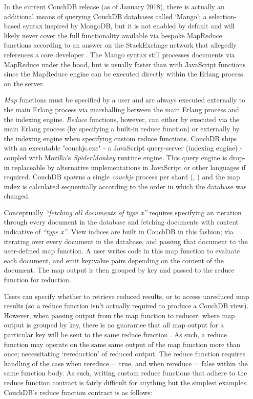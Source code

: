 In the current CouchDB release (as of January 2018), there is actually an additional means of querying CouchDB databases called `Mango'; a selection-based syntax inspired by MongoDB, but it is not enabled by default and will likely never cover the full functionality available via bespoke MapReduce functions according to an answer on the StackExchnge network that allegedly references a core developer \cite{Mango}. The Mango syntax still processes documents via MapReduce under the hood, but is usually faster than with JavaScript functions since the MapReduce engine can be executed directly within the Erlang process on the server.

\textit{Map} functions must be specified by a user and are always executed externally to the main Erlang process via marshalling between the main Erlang process and the indexing engine. \textit{Reduce} functions, however, can either by executed via the main Erlang process (by specifying a built-in reduce function) or externally by the indexing engine when specifying custom reduce functions. CouchDB ships with an executable "couchjs.exe" - a JavaScript query-server (indexing engine) - coupled with Mozilla's \textit{SpiderMonkey} runtime engine. This query engine is drop-in replaceable by alternative implementations in JavaScript or other languages if required. CouchDB spawns a single \textit{couchjs} process per shard (\cite{slack2Nov}, \cite{slack7Nov}) and the map index is calculated sequentially according to the order in which the database was changed.

Conceptually \textit{``fetching all documents of type x''} requires specifying an iteration through every document in the database and fetching documents with content indicative of \textit{``type x''}. View indices are built in CouchDB in this fashion; via iterating over every document in the database, and passing that document to the user-defined map function. A user writes code in this map function to evaluate each document, and emit key:value pairs depending on the content of the document. The map output is then grouped by key and passed to the reduce function for reduction.

Users can specify whether to retrieve reduced results, or to access unreduced map results (so a reduce function isn't actually required to produce a CouchDB view). However, when passing output from the map function to reducer, where map output is grouped by key, there is no guarantee that all map output for a particular key will be sent to the same reduce function \cite{reduceFunctions}. As such, a reduce function may operate on the same same output of the map function more than once; necessitating `rereduction' of reduced output. The reduce function requires handling of the case when rereduce = true, and when rereduce = false within the same function body. As such, writing custom reduce functions that adhere to the reduce function contract is fairly difficult for anything but the simplest examples. CouchDB's reduce function contract is as follows:


